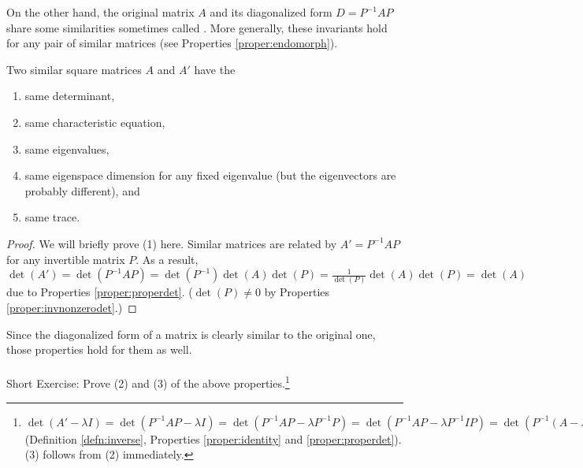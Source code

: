 On the other hand, the original matrix $A$ and its diagonalized form $D = P^{-1}AP$ share some similarities sometimes called . More generally, these invariants hold for any pair of similar matrices (see Properties \ref{proper:endomorph}). 
\begin{proper}
\label{proper:similarinvariant}
Two similar square matrices $A$ and $A'$ have the
\begin{enumerate}
\item same determinant, 
\item same characteristic equation,
\item same eigenvalues,
\item same eigenspace dimension for any fixed eigenvalue (but the eigenvectors are probably different), and
\item same trace.
\end{enumerate}
\end{proper}
\begin{proof}
We will briefly prove (1) here. Similar matrices are related by $A' = P^{-1}AP$ for any invertible matrix $P$. As a result, $\det(A') = \det(P^{-1}AP) = \det(P^{-1})\det(A)\det(P) = \frac{1}{\det(P)}\det(A)\det(P) = \det(A)$ due to Properties \ref{proper:properdet}. ($\det(P) \neq 0$ by Properties \ref{proper:invnonzerodet}.)
\end{proof}
Since the diagonalized form of a matrix is clearly similar to the original one, those properties hold for them as well. \\
\\
Short Exercise: Prove (2) and (3) of the above properties.\footnote{$\det(A'-\lambda I) = \det(P^{-1}AP-\lambda I) = \det(P^{-1}AP-\lambda P^{-1}P) = \det(P^{-1}AP-\lambda P^{-1}IP) = \det(P^{-1}(A-\lambda I)P) = \det(P^{-1})\det(A-\lambda I)\det(P) = \det(A-\lambda I)$ (Definition \ref{defn:inverse}, Properties \ref{proper:identity} and \ref{proper:properdet}). (3) follows from (2) immediately.}\par

